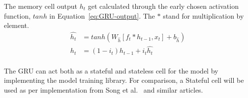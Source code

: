 The memory cell output $h_t$ get calculated through the early chosen activation function, $tanh$ in Equation~\ref{eq:GRU-output}.
The $\ast$ stand for multiplication by element.
\begin{equation}
    \begin{split}
        \hat{h_t} &= tanh \left (W_{\hat{h}} \left [f_t \ast h_{t-1}, x_t \right] + b_{\hat{h}} \right ) \\
        h_t &= \left (1-i_t \right) h_{t-1}+i_t \hat{h_t}
    \end{split}
    \label{eq:GRU-output}
\end{equation} \\
The GRU can act both as a stateful and stateless cell for the model by implementing the model training library.
For comparison, a Stateful cell will be used as per implementation from Song et al.~\cite{song_lithium-ion_2018} and similar articles.
%
%
%
%

